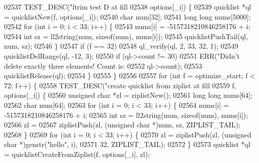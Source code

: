 \begin{DoxyCode}
{{{{{{{{{{{{{{{{{{{{{{{{{{{{{{{{{{{{{{{{{{{{{{{{{{{{{{{{{{{{{{{{{{{{{{{{{{{{{{{{{{{{{{{{{{{{{{{{{{{{02537             TEST\_DESC(\textcolor{stringliteral}{"ltrim test D at fill %
02538                       options[\_i]) \{
02539                 quicklist *ql = quicklistNew(f, options[\_i]);
02540                 \textcolor{keywordtype}{char} num[32];
02541                 \textcolor{keywordtype}{long} \textcolor{keywordtype}{long} nums[5000];
02542                 \textcolor{keywordflow}{for} (\textcolor{keywordtype}{int} i = 0; i < 33; i++) \{
02543                     nums[i] = -5157318210846258176 + i;
02544                     \textcolor{keywordtype}{int} sz = ll2string(num, \textcolor{keyword}{sizeof}(num), nums[i]);
02545                     quicklistPushTail(ql, num, sz);
02546                 \}
02547                 \textcolor{keywordflow}{if} (f == 32)
02548                     ql\_verify(ql, 2, 33, 32, 1);
02549                 quicklistDelRange(ql, -12, 3);
02550                 \textcolor{keywordflow}{if} (ql->count != 30)
02551                     ERR(\textcolor{stringliteral}{"Didn't delete exactly three elements!  Count is: %
02552                         ql->count);
02553                 quicklistRelease(ql);
02554             \}
02555         \}
02556 
02557         \textcolor{keywordflow}{for} (\textcolor{keywordtype}{int} f = optimize\_start; f < 72; f++) \{
02558             TEST\_DESC(\textcolor{stringliteral}{"create quicklist from ziplist at fill %
02559                       f, options[\_i]) \{
02560                 \textcolor{keywordtype}{unsigned} \textcolor{keywordtype}{char} *zl = ziplistNew();
02561                 \textcolor{keywordtype}{long} \textcolor{keywordtype}{long} nums[64];
02562                 \textcolor{keywordtype}{char} num[64];
02563                 \textcolor{keywordflow}{for} (\textcolor{keywordtype}{int} i = 0; i < 33; i++) \{
02564                     nums[i] = -5157318210846258176 + i;
02565                     \textcolor{keywordtype}{int} sz = ll2string(num, \textcolor{keyword}{sizeof}(num), nums[i]);
02566                     zl =
02567                         ziplistPush(zl, (\textcolor{keywordtype}{unsigned} \textcolor{keywordtype}{char} *)num, sz, ZIPLIST\_TAIL);
02568                 \}
02569                 \textcolor{keywordflow}{for} (\textcolor{keywordtype}{int} i = 0; i < 33; i++) \{
02570                     zl = ziplistPush(zl, (\textcolor{keywordtype}{unsigned} \textcolor{keywordtype}{char} *)genstr(\textcolor{stringliteral}{"hello"}, i),
02571                                      32, ZIPLIST\_TAIL);
02572                 \}
02573                 quicklist *ql = quicklistCreateFromZiplist(f, options[\_i], zl);
}}}}}}}}}}}}}}}}}}}}}}}}}}}}}}}}}}}}}}}}}}}}}}}}}}}}}}}}}}}}}}}}}}}}}}}}}}}}}}}}}}}}}}}}}}}}}}}}}}}}}}}
\end{DoxyCode}
